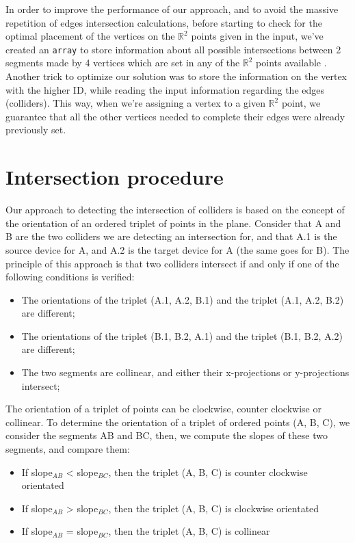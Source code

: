 \documentclass[12pt]{article}
\begin{document}
\qquad In order to improve the performance of our approach, and to avoid the massive repetition of edges intersection calculations, before starting to check for the optimal placement of the vertices on the $\mathbb{R}^2$ points given in the input, we've created an \verb|array| to store information about all possible intersections between 2 segments made by 4 vertices which are set in any of the $\mathbb{R}^2$ points available . Another trick to optimize our solution was to store the information on the vertex with the higher ID, while reading the input information regarding the edges (colliders). This way, when we're assigning a vertex to a given $\mathbb{R}^2$ point, we guarantee that all the other vertices needed to complete their edges were already previously set.

\section*{Intersection procedure}\label{intersectPorc}

\qquad Our approach to detecting the intersection of colliders is based on the concept of the orientation of an ordered triplet of points in the plane. Consider that A and B are the two colliders we are detecting an intersection for, and that A.1 is the source device for A, and A.2 is the target device for A (the same goes for B). The principle of this approach is that two colliders intersect if and only if one of the following conditions is verified:
\begin{itemize}
    \itemsep0em
    \item The orientations of the triplet (A.1, A.2, B.1) and the triplet (A.1, A.2, B.2) are different;
    \item The orientations of the triplet (B.1, B.2, A.1) and the triplet (B.1, B.2, A.2) are different;
    \item The two segments are collinear, and either their x-projections or y-projections intersect;
\end{itemize}

The orientation of a triplet of points can be clockwise, counter clockwise or collinear. To determine the orientation of a triplet of ordered points (A, B, C), we consider the segments AB and BC, then, we compute the slopes of these two segments, and compare them:

\begin{itemize}
    \itemsep0em
    \item If slope$_{AB}$ < slope$_{BC}$, then the triplet (A, B, C) is counter clockwise orientated
    \item If slope$_{AB}$ > slope$_{BC}$, then the triplet (A, B, C) is clockwise orientated
    \item If slope$_{AB}$ = slope$_{BC}$, then the triplet (A, B, C) is collinear
\end{itemize}
\end{document}
